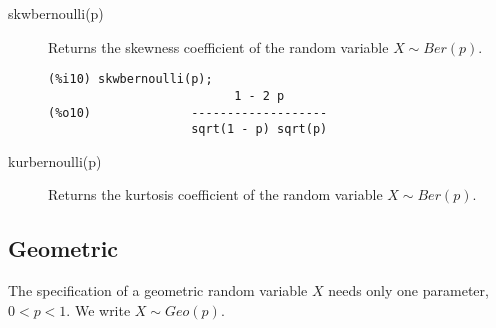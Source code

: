 \documentclass[12pt,a4paper]{article}
\begin{document}
\begin{description}
\item[skwbernoulli(p)] Returns the skewness coefficient of the random variable  $X \sim Ber(p)$.

\begin{verbatim}
(%i10) skwbernoulli(p);
                          1 - 2 p
(%o10)              -------------------
                    sqrt(1 - p) sqrt(p)
\end{verbatim}

\item[kurbernoulli(p)] Returns the kurtosis coefficient of the random variable  $X \sim Ber(p)$.

\end{description}

\subsection{Geometric}

The specification of a geometric random variable $X$ needs only one parameter,  $0<p<1$. We write $X \sim Geo(p)$.
\end{document}
